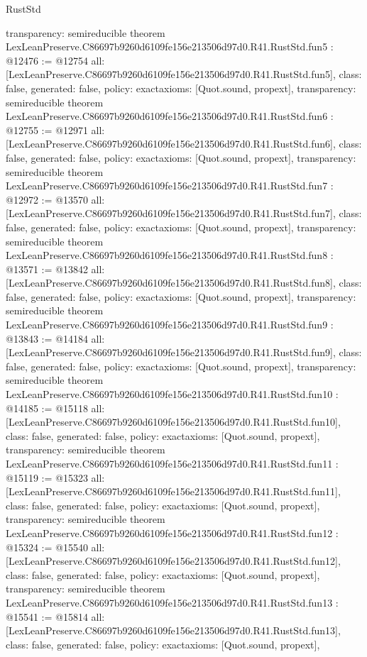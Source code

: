 \begin{lexlean}{RustStd}
\begin{coremodule}
{  transparency: semireducible
}
theorem LexLeanPreserve.C86697b9260d6109fe156e213506d97d0.R41.RustStd.fun5 : @12476 := @12754 {
  all: [LexLeanPreserve.C86697b9260d6109fe156e213506d97d0.R41.RustStd.fun5],
  class: false,
  generated: false,
  policy: exact{axioms: [Quot.sound, propext]},
  transparency: semireducible
}
theorem LexLeanPreserve.C86697b9260d6109fe156e213506d97d0.R41.RustStd.fun6 : @12755 := @12971 {
  all: [LexLeanPreserve.C86697b9260d6109fe156e213506d97d0.R41.RustStd.fun6],
  class: false,
  generated: false,
  policy: exact{axioms: [Quot.sound, propext]},
  transparency: semireducible
}
theorem LexLeanPreserve.C86697b9260d6109fe156e213506d97d0.R41.RustStd.fun7 : @12972 := @13570 {
  all: [LexLeanPreserve.C86697b9260d6109fe156e213506d97d0.R41.RustStd.fun7],
  class: false,
  generated: false,
  policy: exact{axioms: [Quot.sound, propext]},
  transparency: semireducible
}
theorem LexLeanPreserve.C86697b9260d6109fe156e213506d97d0.R41.RustStd.fun8 : @13571 := @13842 {
  all: [LexLeanPreserve.C86697b9260d6109fe156e213506d97d0.R41.RustStd.fun8],
  class: false,
  generated: false,
  policy: exact{axioms: [Quot.sound, propext]},
  transparency: semireducible
}
theorem LexLeanPreserve.C86697b9260d6109fe156e213506d97d0.R41.RustStd.fun9 : @13843 := @14184 {
  all: [LexLeanPreserve.C86697b9260d6109fe156e213506d97d0.R41.RustStd.fun9],
  class: false,
  generated: false,
  policy: exact{axioms: [Quot.sound, propext]},
  transparency: semireducible
}
theorem LexLeanPreserve.C86697b9260d6109fe156e213506d97d0.R41.RustStd.fun10 : @14185 := @15118 {
  all: [LexLeanPreserve.C86697b9260d6109fe156e213506d97d0.R41.RustStd.fun10],
  class: false,
  generated: false,
  policy: exact{axioms: [Quot.sound, propext]},
  transparency: semireducible
}
theorem LexLeanPreserve.C86697b9260d6109fe156e213506d97d0.R41.RustStd.fun11 : @15119 := @15323 {
  all: [LexLeanPreserve.C86697b9260d6109fe156e213506d97d0.R41.RustStd.fun11],
  class: false,
  generated: false,
  policy: exact{axioms: [Quot.sound, propext]},
  transparency: semireducible
}
theorem LexLeanPreserve.C86697b9260d6109fe156e213506d97d0.R41.RustStd.fun12 : @15324 := @15540 {
  all: [LexLeanPreserve.C86697b9260d6109fe156e213506d97d0.R41.RustStd.fun12],
  class: false,
  generated: false,
  policy: exact{axioms: [Quot.sound, propext]},
  transparency: semireducible
}
theorem LexLeanPreserve.C86697b9260d6109fe156e213506d97d0.R41.RustStd.fun13 : @15541 := @15814 {
  all: [LexLeanPreserve.C86697b9260d6109fe156e213506d97d0.R41.RustStd.fun13],
  class: false,
  generated: false,
  policy: exact{axioms: [Quot.sound, propext]},
}
\end{coremodule}
\end{lexlean}
